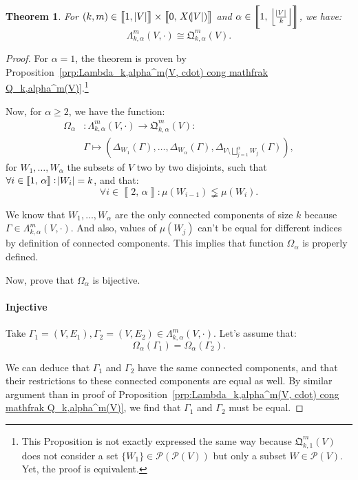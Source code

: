 \documentclass{article}
\newtheorem{theorem}[lemma]{Theorem}
\theoremstyle{definition}
\theoremstyle{remark}
\newcommand{\intint}[2]{\left\llbracket#1, \, #2\right\rrbracket}
\newcommand{\floor}[1]{\left\lfloor#1\right\rfloor}
\begin{document}
			\begin{theorem} For $(k, m) \in \intint 1{\abs V} \times \intint 0{X(\abs V)}$ and $\alpha \in \intint 1{\floor {\frac {\abs V}k}}$, we have:
			\[\Lambda_{k,\alpha}^m(V, \cdot) \cong \mathfrak Q_{k,\alpha}^m(V).\]
			\end{theorem}

			\begin{proof} For $\alpha=1$, the theorem is proven by Proposition~\ref{prp:Lambda_k,alpha^m(V, cdot) cong mathfrak Q_k,alpha^m(V)}.\footnote{This Proposition is not exactly
			expressed the same way because $\mathfrak Q_{k,1}^m(V)$ does not consider a set $\{W_1\} \in \mathcal P\left(\mathcal P(V)\right)$ but only a subset $W \in \mathcal P(V)$.
			Yet, the proof is equivalent.}

			Now, for $\alpha \geq 2$, we have the function:
			\begin{align*}
				\Omega_\alpha &: \Lambda_{k,\alpha}^m(V, \cdot) \to \mathfrak Q_{k,\alpha}^m(V) : \\
				&\Gamma \mapsto \left(\Delta_{W_1}(\Gamma), \ldots, \Delta_{W_\alpha}(\Gamma), \Delta_{V \setminus \bigsqcup_{j=1}^\alpha W_j}(\Gamma)\right),
			\end{align*}
			for $W_1, \ldots, W_\alpha$ the subsets of $V$ two by two disjoints, such that $\forall i \in \intint 1\alpha : \abs {W_i}=k$, and that:
			\[\forall i \in \intint 2\alpha : \mu(W_{i-1}) \lneqq \mu(W_i).\]

			We know that $W_1, \ldots, W_\alpha$ are the only connected components of size $k$ because $\Gamma \in \Lambda_{k,\alpha}^m(V, \cdot)$. And also,
			values of $\mu(W_j)$ can't be equal for different indices by definition of connected components. This implies that function $\Omega_\alpha$ is properly
			defined.

			Now, prove that $\Omega_\alpha$ is bijective.

			\paragraph{Injective} Take $\Gamma_1 = (V, E_1), \Gamma_2 = (V, E_2) \in \Lambda_{k,\alpha}^m(V, \cdot)$. Let's assume that:
			\[\Omega_\alpha(\Gamma_1) = \Omega_\alpha(\Gamma_2).\]

			We can deduce that $\Gamma_1$ and $\Gamma_2$ have the same connected components, and that their restrictions to these connected components are equal as well.
			By similar argument than in proof of Proposition~\ref{prp:Lambda_k,alpha^m(V, cdot) cong mathfrak Q_k,alpha^m(V)}, we find that $\Gamma_1$ and $\Gamma_2$ must be equal.


\end{proof}
\end{document}
